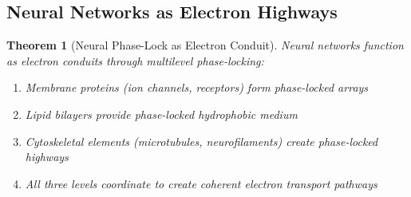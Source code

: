 \documentclass[11pt]{article}
\newtheorem{theorem}{Theorem}[section]
\theoremstyle{remark}
\begin{document}
\subsection{Neural Networks as Electron Highways}

\begin{theorem}[Neural Phase-Lock as Electron Conduit]
\label{thm:neural_electron_conduit}
Neural networks function as electron conduits through multilevel phase-locking:
\begin{enumerate}
\item Membrane proteins (ion channels, receptors) form phase-locked arrays
\item Lipid bilayers provide phase-locked hydrophobic medium
\item Cytoskeletal elements (microtubules, neurofilaments) create phase-locked highways
\item All three levels coordinate to create coherent electron transport pathways
\end{enumerate}
\end{theorem}
\end{document}
